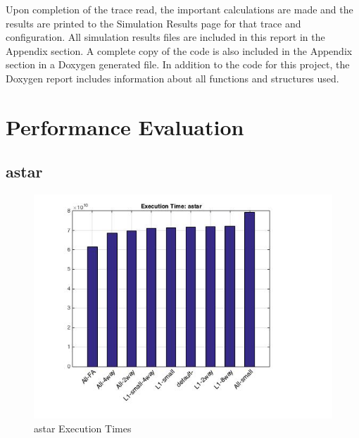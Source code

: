 \documentclass[11pt,titlepage]{article}
\begin{document}
    Upon completion of the trace read, the important calculations are made and the results are printed to the Simulation Results page for that trace and configuration. All simulation results files are included in this report in the Appendix section. A complete copy of the code is also included in the Appendix section in a Doxygen generated file. In addition to the code for this project, the Doxygen report includes information about all functions and structures used. 
    
\section{Performance Evaluation}

    \subsection{astar}
	\begin{figure}[H]
            \centering
            \includegraphics[scale=0.75]{etastar}
            \caption{astar Execution Times}
            \label{fig:etastar}
        \end{figure}
\end{document}
